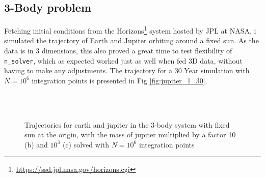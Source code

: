 \documentclass[10pt,showpacs,preprintnumbers,amsmath,amssymb,nofootinbib,aps,prl,twocolumn,groupedaddress,superscriptaddress,showkeys]{revtex4-1}
\begin{document}
\subsection{3-Body problem}
  Fetching initial conditions from the Horizons\footnote{\url{https://ssd.jpl.nasa.gov/horizons.cgi}} system hosted by JPL at NASA, i simulated the trajectory of Earth and Jupiter orbiting around a fixed sun. As the data is in 3 dimensions, this also proved a great time to test flexibility of \lstinline{n_solver}, which as expected worked just as well when fed 3D data, without having to make any adjustments. The trajectory for a 30 Year simulation with $N=10^6$ integration points is presented in Fig \ref{fig:jupiter_1_30}.

  \begin{figure}[H]
    \center
    \\
    \\
    \caption{Trajectories for earth and jupiter in the 3-body system with fixed sun at the origin, with the mass of jupiter multiplied by a factor 10 (b) and $10^3$ (c) solved with $N=10^6$ integration points}
    \label{fig:exe jupiter mass increase}
  \end{figure}
\end{document}
